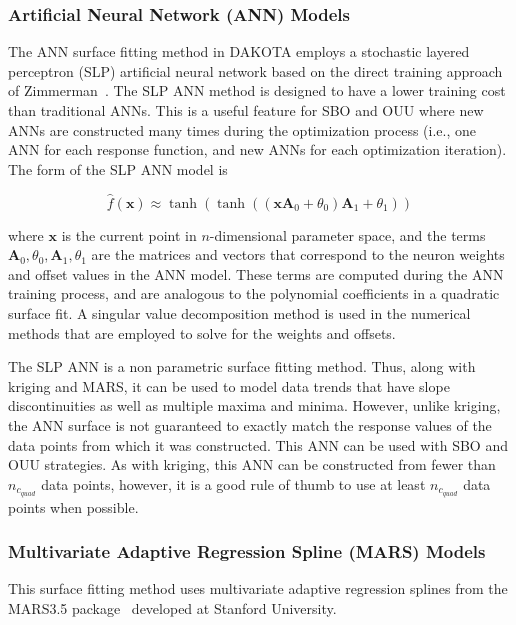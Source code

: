 \subsubsection{Artificial Neural Network (ANN) Models}\label{models:surf:ann}

The ANN surface fitting method in DAKOTA employs a stochastic layered
perceptron (SLP) artificial neural network based on the direct
training approach of Zimmerman~\cite{Zim96}. The SLP ANN method is
designed to have a lower training cost than traditional ANNs. This is
a useful feature for SBO and OUU where new ANNs are constructed many
times during the optimization process (i.e., one ANN for each response
function, and new ANNs for each optimization iteration). The form of
the SLP ANN model is

\begin{equation}
  \hat{f}(\mathbf{x}) \approx
  \tanh(\tanh((\mathbf{x A}_{0}+\theta_{0})\mathbf{A}_{1}+\theta_{1}))
  \label{models:surf:equation09}
\end{equation}

where $\mathbf{x}$ is the current point in $n$-dimensional parameter
space, and the terms
$\mathbf{A}_{0},\theta_{0},\mathbf{A}_{1},\theta_{1}$ are the matrices
and vectors that correspond to the neuron weights and offset values in
the ANN model. These terms are computed during the ANN training
process, and are analogous to the polynomial coefficients in a
quadratic surface fit. A singular value decomposition method is used
in the numerical methods that are employed to solve for the weights
and offsets.

The SLP ANN is a non parametric surface fitting method. Thus, along
with kriging and MARS, it can be used to model data trends that have
slope discontinuities as well as multiple maxima and minima. However,
unlike kriging, the ANN surface is not guaranteed to exactly match the
response values of the data points from which it was constructed. This
ANN can be used with SBO and OUU strategies. As with kriging, this ANN
can be constructed from fewer than $n_{c_{quad}}$ data points,
however, it is a good rule of thumb to use at least $n_{c_{quad}}$
data points when possible.

\subsubsection{Multivariate Adaptive Regression Spline (MARS) Models}\label{models:surf:mars}

This surface fitting method uses multivariate adaptive regression
splines from the MARS3.5 package~\cite{Fri91} developed at Stanford
University. 

